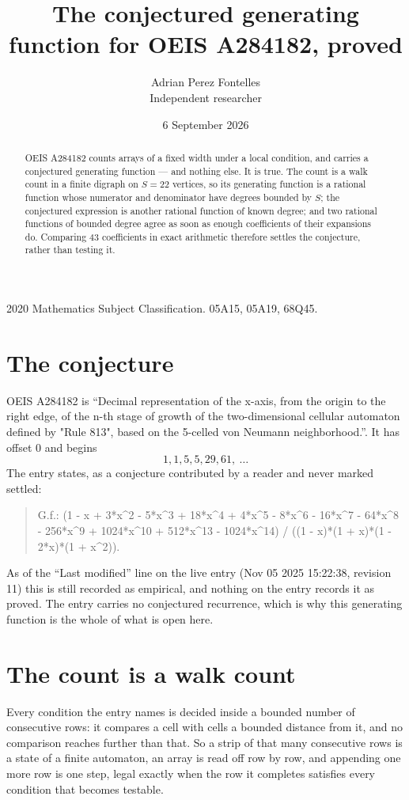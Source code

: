 \documentclass[11pt,a4paper]{article}
\title{The conjectured generating function for OEIS A284182, proved}
\author{Adrian Perez Fontelles\\ \small Independent researcher}
\date{6 September 2026}
\theoremstyle{plain}
\theoremstyle{definition}
\begin{document}
\maketitle

\begin{abstract}
OEIS A284182 counts arrays of a fixed width under a local condition, and carries a conjectured
generating function --- and nothing else. It is true. The count is a walk count in a finite
digraph on $S=22$ vertices, so its generating function is a rational function whose numerator
and denominator have degrees bounded by $S$; the conjectured expression is another rational
function of known degree; and two rational functions of bounded degree agree as soon as enough
coefficients of their expansions do. Comparing $43$ coefficients in exact arithmetic
therefore settles the conjecture, rather than testing it.
\end{abstract}

\noindent\small 2020 Mathematics Subject Classification. 05A15, 05A19, 68Q45.\normalsize

\section{The conjecture}

OEIS A284182 is ``Decimal representation of the x-axis, from the origin to the right edge, of the n-th stage of growth of the two-dimensional cellular automaton defined by "Rule 813", based on the 5-celled von Neumann neighborhood.''. It has offset $0$ and begins
\[
1, 1, 5, 5, 29, 61,\ \dots
\]
The entry states, as a conjecture contributed by a reader and never marked settled:
\begin{quote}
G.f.: (1 - x + 3*x\^{}2 - 5*x\^{}3 + 18*x\^{}4 + 4*x\^{}5 - 8*x\^{}6 - 16*x\^{}7 - 64*x\^{}8 - 256*x\^{}9 + 1024*x\^{}10 + 512*x\^{}13 - 1024*x\^{}14) / ((1 - x)*(1 + x)*(1 - 2*x)*(1 + x\^{}2)).
\end{quote}
As of the ``Last modified'' line on the live entry (Nov 05 2025 15:22:38, revision 11) this is still
recorded as empirical, and nothing on the entry records it as proved. The entry carries no
conjectured recurrence, which is why this generating function is the whole of what is open
here.

\section{The count is a walk count}

Every condition the entry names is decided inside a bounded number of consecutive rows: it
compares a cell with cells a bounded distance from it, and no comparison reaches further than
that. So a strip of that many consecutive rows is a state of a finite automaton, an array is
read off row by row, and appending one more row is one step, legal exactly when the row it
completes satisfies every condition that becomes testable.
\end{document}
